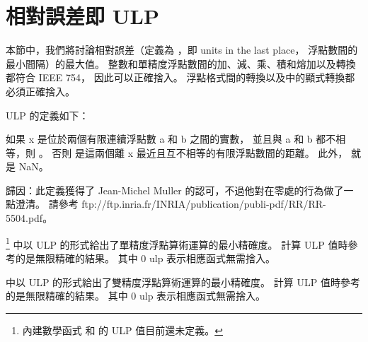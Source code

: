 \section{相對誤差即 ULP}

本節中，我們將討論相對誤差（定義為 ，即 units in the last place，
浮點數間的最小間隔）的最大值。
整數和單精度浮點數間的加、減、乘、積和熔加以及轉換都符合 IEEE 754，
因此可以正確捨入。
浮點格式間的轉換以及中的顯式轉換都必須正確捨入。

ULP 的定義如下：

{\ftRef%
如果 x 是位於兩個有限連續浮點數 a 和 b 之間的實數，
並且與 a 和 b 都不相等，則 。
否則  是這兩個離 x 最近且互不相等的有限浮點數間的距離。
此外，  就是 NaN。}

{\ftRef%
歸因：此定義獲得了 Jean-Michel Muller 的認可，不過他對在零處的行為做了一點澄清。
請參考 ftp://ftp.inria.fr/INRIA/publication/publi-pdf/RR/RR-5504.pdf。}

\footnote{%
內建數學函式  和  的 ULP 值目前還未定義。}%
中以 ULP 的形式給出了單精度浮點算術運算的最小精確度。
計算 ULP 值時參考的是無限精確的結果。
其中 0 ulp 表示相應函式無需捨入。

{}

中以 ULP 的形式給出了雙精度浮點算術運算的最小精確度。
計算 ULP 值時參考的是無限精確的結果。
其中 0 ulp 表示相應函式無需捨入。

{}

